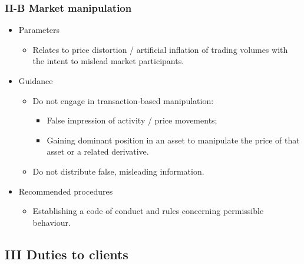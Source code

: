 \documentclass[../notes_compiled.tex]{subfiles}
\begin{document}
\subsubsection{II-B Market manipulation}
\begin{itemize}
\item Parameters
\begin{itemize}
\item Relates to price distortion / artificial inflation of trading volumes with the intent to mislead market participants.
\end{itemize}
\item Guidance
\begin{itemize}
\item Do not engage in transaction-based manipulation:
\begin{itemize}
\item False impression of activity / price movements;
\item Gaining dominant position in an asset to manipulate the price of that asset or a related derivative.
\end{itemize}
\item Do not distribute false, misleading information.
\end{itemize}
\item Recommended procedures
\begin{itemize}
\item Establishing a code of conduct and rules concerning permissible behaviour.
\end{itemize}
\end{itemize}
\subsection{III Duties to clients}
\end{document}
